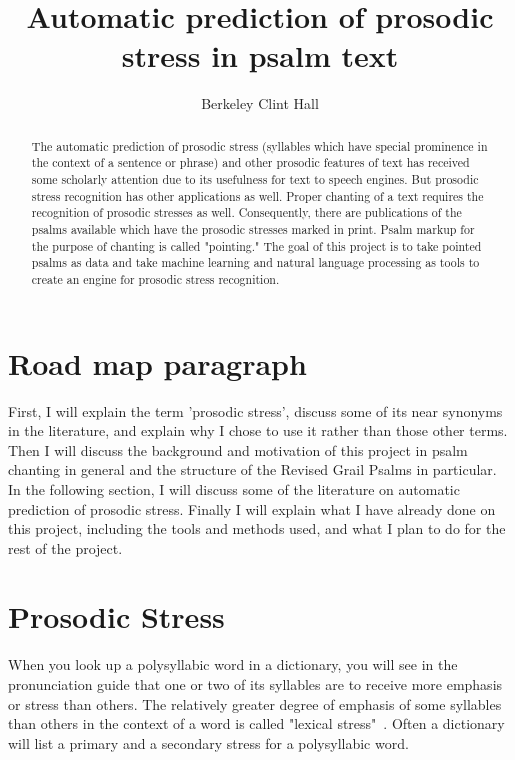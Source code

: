 \documentclass[12pt]{proposal}
\title{Automatic prediction of prosodic stress in psalm text}
\author{Berkeley Clint Hall}
\begin{document}
    \begin{preliminary}
        \maketitle
    	\begin{abstract}
            The automatic prediction of prosodic stress (syllables which have special prominence in the context of a sentence or phrase) and other prosodic features of text has received some scholarly attention due to its usefulness for text to speech engines.
            But prosodic stress recognition has other applications as well.
            Proper chanting of a text requires the recognition of prosodic stresses as well.
            Consequently, there are publications of the psalms available which have the prosodic stresses marked in print.
            Psalm markup for the purpose of chanting is called "pointing." The goal of this project is to take pointed psalms as data and take machine learning and natural language processing as tools to create an engine for prosodic stress recognition.
    	\end{abstract}
    	\tableofcontents
    \end{preliminary}

\section{Road map paragraph}

First, I will explain the term 'prosodic stress', discuss some of its near
synonyms in the literature, and explain why I chose to use it rather than those
other terms. Then I will discuss the background and motivation of this project
in psalm chanting in general and the structure of the Revised Grail Psalms in
particular. In the following section, I will discuss some of the literature on
automatic prediction of prosodic stress. Finally I will explain what I have
already done on this project, including the tools and methods used, and what I
plan to do for the rest of the project.

\section{Prosodic Stress} 

When you look up a polysyllabic word in a dictionary,
you will see in the pronunciation guide that one or two of its syllables are to
receive more emphasis or stress than others. The relatively greater degree of
emphasis of some syllables than others in the context of a word is called
"lexical stress"~\cite{crystal_dictionary_2008}. Often a dictionary will list a
primary and a secondary stress for a polysyllabic word.
\end{document}
